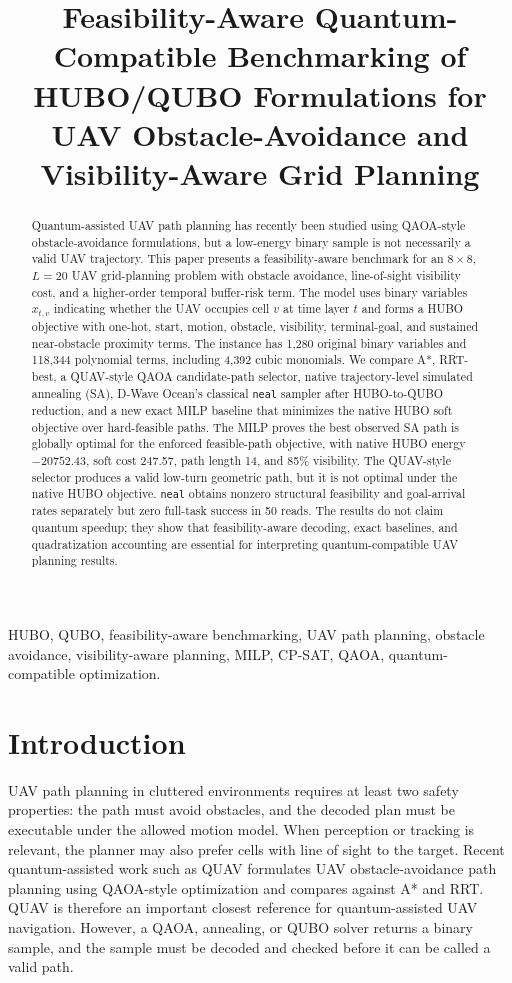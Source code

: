 \documentclass[10pt,conference]{IEEEtran}
\title{Feasibility-Aware Quantum-Compatible Benchmarking of HUBO/QUBO Formulations for UAV Obstacle-Avoidance and Visibility-Aware Grid Planning}
\author{\IEEEauthorblockN{Author names to be finalized}
\IEEEauthorblockA{Affiliations to be finalized\\
Email: to be finalized}}
\begin{document}
\maketitle

\begin{abstract}
Quantum-assisted UAV path planning has recently been studied using QAOA-style obstacle-avoidance formulations, but a low-energy binary sample is not necessarily a valid UAV trajectory. This paper presents a feasibility-aware benchmark for an $8\times8$, $L=20$ UAV grid-planning problem with obstacle avoidance, line-of-sight visibility cost, and a higher-order temporal buffer-risk term. The model uses binary variables $x_{t,v}$ indicating whether the UAV occupies cell $v$ at time layer $t$ and forms a HUBO objective with one-hot, start, motion, obstacle, visibility, terminal-goal, and sustained near-obstacle proximity terms. The instance has 1,280 original binary variables and 118,344 polynomial terms, including 4,392 cubic monomials. We compare A*, RRT-best, a QUAV-style QAOA candidate-path selector, native trajectory-level simulated annealing (SA), D-Wave Ocean's classical \texttt{neal} sampler after HUBO-to-QUBO reduction, and a new exact MILP baseline that minimizes the native HUBO soft objective over hard-feasible paths. The MILP proves the best observed SA path is globally optimal for the enforced feasible-path objective, with native HUBO energy $-20752.43$, soft cost 247.57, path length 14, and 85\% visibility. The QUAV-style selector produces a valid low-turn geometric path, but it is not optimal under the native HUBO objective. \texttt{neal} obtains nonzero structural feasibility and goal-arrival rates separately but zero full-task success in 50 reads. The results do not claim quantum speedup; they show that feasibility-aware decoding, exact baselines, and quadratization accounting are essential for interpreting quantum-compatible UAV planning results.
\end{abstract}

\begin{IEEEkeywords}
HUBO, QUBO, feasibility-aware benchmarking, UAV path planning, obstacle avoidance, visibility-aware planning, MILP, CP-SAT, QAOA, quantum-compatible optimization.
\end{IEEEkeywords}

\section{Introduction}
UAV path planning in cluttered environments requires at least two safety properties: the path must avoid obstacles, and the decoded plan must be executable under the allowed motion model. When perception or tracking is relevant, the planner may also prefer cells with line of sight to the target. Recent quantum-assisted work such as QUAV formulates UAV obstacle-avoidance path planning using QAOA-style optimization and compares against A* and RRT. QUAV is therefore an important closest reference for quantum-assisted UAV navigation. However, a QAOA, annealing, or QUBO solver returns a binary sample, and the sample must be decoded and checked before it can be called a valid path.
\end{document}
